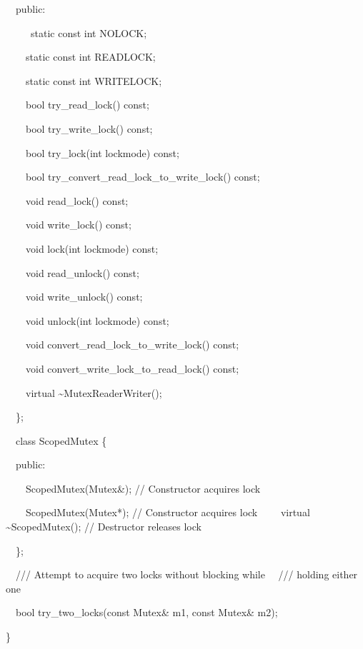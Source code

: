 \documentclass[letterpaper]{article}
\begin{document}
{\ttfamily
\ \ public:}

{\ttfamily
\ \ \ \ \ static const int NOLOCK;}

{\ttfamily
\ \ \ \ static const int READLOCK;}

{\ttfamily
\ \ \ \ static const int WRITELOCK;}

{\ttfamily
\ \ \ \ bool try\_read\_lock() const;}

{\ttfamily
\ \ \ \ bool try\_write\_lock() const;}

{\ttfamily
\ \ \ \ bool try\_lock(int lockmode) const;}

{\ttfamily
\ \ \ \ bool try\_convert\_read\_lock\_to\_write\_lock() const;}

{\ttfamily
\ \ \ \ void read\_lock() const;}

{\ttfamily
\ \ \ \ void write\_lock() const;}

{\ttfamily
\ \ \ \ void lock(int lockmode) const;}

{\ttfamily
\ \ \ \ void read\_unlock() const;}

{\ttfamily
\ \ \ \ void write\_unlock() const;}

{\ttfamily
\ \ \ \ void unlock(int lockmode) const;}

{\ttfamily
\ \ \ \ void convert\_read\_lock\_to\_write\_lock() const;}

{\ttfamily
\ \ \ \ void convert\_write\_lock\_to\_read\_lock() const;}

{\ttfamily
\ \ \ \ virtual \~{}MutexReaderWriter();}

{\ttfamily
\ \ \};}


\bigskip

{\ttfamily
\ \ class ScopedMutex \{}

{\ttfamily
\ \ public:}

{\ttfamily
\ \ \ \ ScopedMutex(Mutex\&); // Constructor acquires lock}

{\ttfamily
\ \ \ \ ScopedMutex(Mutex*); // Constructor acquires lock\newline
\ \ \ \ virtual \~{}ScopedMutex(); // Destructor releases lock}

{\ttfamily
\ \ \};}


\bigskip

{\ttfamily
\ \ /// Attempt to acquire two locks without blocking while \newline
\ \ /// holding either one}

{\ttfamily
\ \ bool try\_two\_locks(const Mutex\& m1, const Mutex\& m2);}

{\ttfamily
\}}
\end{document}
